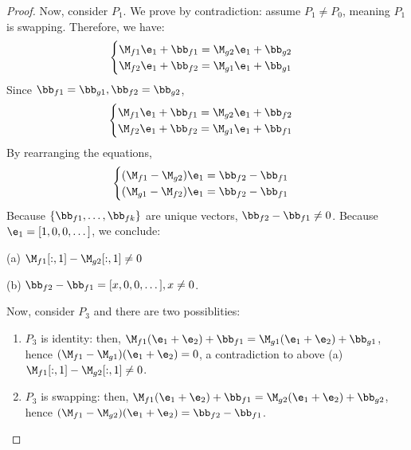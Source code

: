 \begin{proof}
    Now, consider $P_1$. We prove by contradiction: assume $P_1 \neq P_0$, meaning $P_1$ is swapping.
    Therefore, we have:
    \begin{align*}
        \begin{cases}
            \M_{f1} \e_1 + \bb_{f1} = \M_{g2} \e_1 + \bb_{g2}\\
            \M_{f2} \e_1 + \bb_{f2} = \M_{g1} \e_1 + \bb_{g1}\\
        \end{cases}
    \end{align*}
    Since $\bb_{f1}=\bb_{g1}, \bb_{f2}=\bb_{g2}$,
    \begin{align*}
        \begin{cases}
            \M_{f1} \e_1 + \bb_{f1} = \M_{g2} \e_1 + \bb_{f2}\\
            \M_{f2} \e_1 + \bb_{f2} = \M_{g1} \e_1 + \bb_{f1}\\
        \end{cases}
    \end{align*}
    By rearranging the equations,
    \begin{align*}
        \begin{cases}
            (\M_{f1}-\M_{g2}) \e_1 = \bb_{f2} - \bb_{f1} \\
            (\M_{g1}-\M_{f2}) \e_1 = \bb_{f2} - \bb_{f1} \\
        \end{cases}
    \end{align*}
    Because $\{\bb_{f1},\dots,\bb_{fk}\}$ are unique vectors,
    $\bb_{f2}-\bb_{f1} \neq 0$. Because $\e_1=[1,0,0,\dots]$, we conclude:
    \begin{myitemize2}
        \item (a) $\M_{f1}[:,1] - \M_{g2}[:,1] \neq 0$
        \item (b) $\bb_{f2} - \bb_{f1} = [x,0,0,\dots], x\neq 0$.
    \end{myitemize2}
    Now, consider $P_3$ and there are two possiblities:
    \begin{enumerate}
        \item $P_3$ is identity:
            then, $\M_{f1}(\e_1+\e_2)+\bb_{f1} = \M_{g1}(\e_1+\e_2)+\bb_{g1}$,
            hence $(\M_{f1}-\M_{g1})(\e_1+\e_2) = 0$, a contradiction to
                above (a) $\M_{f1}[:,1] - \M_{g2}[:,1] \neq 0$.
        \item $P_3$ is swapping:
            then, $\M_{f1}(\e_1+\e_2)+\bb_{f1} = \M_{g2}(\e_1+\e_2)+\bb_{g2}$,
            hence $(\M_{f1}-\M_{g2})(\e_1+\e_2) = \bb_{f2} - \bb_{f1}$.

\end{enumerate}
\end{proof}
